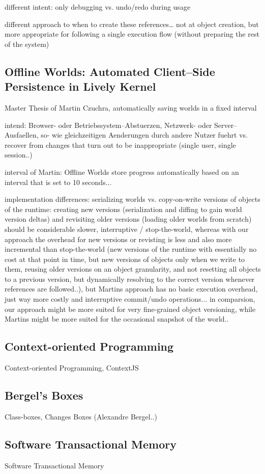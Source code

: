 different intent: only debugging vs. undo/redo during usage

different approach to when to create these references… not at object creation, but more appropriate for following a single execution flow (without preparing the rest of the system)


\subsection{Offline Worlds: Automated Client–Side Persistence in Lively Kernel}
Master Thesis of Martin Czuchra, automatically saving worlds in a fixed interval

intend: Browser- oder Betriebssystem–Abstuerzen, Netzwerk- oder Server–Ausfaellen, so- wie gleichzeitigen Aenderungen durch andere Nutzer fuehrt
vs. recover from changes that turn out to be inappropriate (single user, single session..)

interval of Martin: Offline Worlds store progress automatically based on an interval that is set to 10 seconds...


implementation differences: serializing worlds vs. copy-on-write versions of objects of the runtime: creating new versions (serialization and diffing to gain world version deltas) and revisiting older versions (loading older worlds from scratch) should be considerable slower, interruptive / stop-the-world, whereas with our approach the overhead for new versions or revisting is less and also more incremental than stop-the-world (new versions of the runtime with essentially no cost at that point in time, but new versions of objects only when we write to them, reusing older versions on an object granularity, and not resetting all objects to a previous version, but dynamically resolving to the correct version whenever references are followed..), but Martins approach has no basic execution overhead, just way more costly and interruptive commit/undo operations... in comparsion, our approach might be more suited for very fine-grained object versioning, while Martins might be more suited for the occasional snapshot of the world..


\subsection{Context-oriented Programming}
Context-oriented Programming, ContextJS


\subsection{Bergel's Boxes}
Class-boxes, Changes Boxes (Alexandre Bergel..)


\subsection{Software Transactional Memory}
Software Transactional Memory